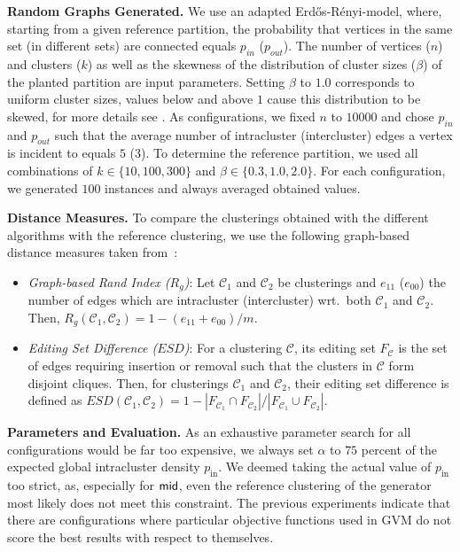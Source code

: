 \documentclass{llncs}
\newcommand{\measure}[1]{\ensuremath{\text{\normalfont{\sffamily {#1}}}}\xspace}
\newcommand{\C}{\ensuremath{\mathcal{C}}}
\newcommand{\andreapar}{\vspace*{.5ex}\par\noindent}
\begin{document}
\andreapar\textbf{Random Graphs Generated.}
We use an adapted Erd\H{o}s-R\'{e}nyi-model, where, starting from a given reference partition, the probability that vertices in the same set (in different sets) are connected equals $p_{in}$ ($p_{out}$). The number of vertices ($n$) and clusters ($k$) as well as the skewness of the distribution of cluster sizes ($\beta$) of the planted partition are input parameters.
Setting $\beta$ to $1.0$ corresponds to uniform cluster sizes, values below and above $1$ cause this distribution to be skewed, for more details see \cite{gs-agdcr-09}. 
As configurations, we fixed $n$ to $10000$ and chose $p_{in}$ and $p_{out}$ such that the average number of intracluster (intercluster) edges a vertex is incident to equals $5$ ($3$). 
To determine the reference partition, we used all combinations of $k \in \{10, 100, 300\}$ and $\beta \in \{0.3, 1.0, 2.0\}$.
For each configuration, we generated $100$ instances and always averaged obtained values. \andreapar\textbf{Distance Measures.}
To compare the clusterings obtained with the different algorithms with the reference clustering, we use the following graph-based distance measures taken from~\cite{dggw-ecgc-08}:
\vspace{-1ex}
\begin{itemize}
\item \emph{Graph-based Rand Index ($R_g$)}: Let $\C_1$ and $\C_2$ be clusterings and $e_{11}$ ($e_{00}$) the number of edges which are intracluster (intercluster) wrt.\ both $\C_1$ and $\C_2$.
 Then, $R_g(\C_1, \C_2) = 1-(e_{11} + e_{00})/m $.
  \item \emph{Editing Set Difference ($ESD$)}: For a clustering $\C$, its editing set $F_{\C}$ is the set of edges requiring insertion or removal such that the clusters in $\C$ form disjoint cliques. Then, for clusterings $\C_1$ and $\C_2$, their editing set difference is defined as
		$ESD(\C_1, \C_2) = 1-|F_{\C_1} \cap F_{\C_2}|/|F_{\C_1} \cup F_{\C_2}|.$
\end{itemize}
\vspace{-1ex}
\andreapar\textbf{Parameters and Evaluation.}
As an exhaustive parameter search for all configurations would be far too expensive, we always set $\alpha$ to $75$ percent of the expected global intracluster density $p_{\text{in}}$.
We deemed taking the actual value of $p_{\text{in}}$ too strict, as, especially for \measure{mid}, even the reference clustering of the generator most likely does not meet this constraint.    
The previous experiments indicate that there are configurations where particular objective functions used in GVM do not score the best results with respect to themselves. 
\end{document}
